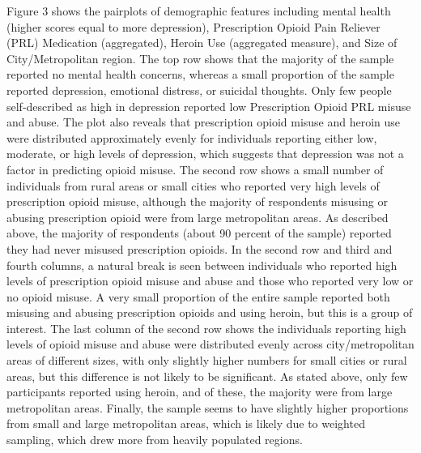 \documentclass[sigconf]{acmart}
\begin{document}

Figure 3 shows the pairplots of demographic features including mental health
(higher scores equal to more depression), Prescription Opioid Pain Reliever
(PRL) Medication (aggregated), Heroin Use (aggregated measure), and Size of 
City/Metropolitan region. The top row shows that the majority of the sample 
reported no mental health concerns, whereas a small proportion of the sample 
reported depression, emotional distress, or suicidal thoughts. Only few people 
self-described as high in depression reported low Prescription Opioid PRL 
misuse and abuse. The plot also reveals that prescription opioid misuse and 
heroin use were distributed approximately evenly for individuals reporting 
either low, moderate, or high levels of depression, which suggests that 
depression was not a factor in predicting opioid misuse. The second row shows 
a small number of individuals from rural areas or small cities who reported 
very high levels of prescription opioid misuse, although the majority of 
respondents misusing or abusing prescription opioid were from large 
metropolitan areas. As described above, the majority of respondents (about
90 percent of the sample) reported they had never misused prescription 
opioids. In the second row and third and fourth columns, a natural break is 
seen between individuals who reported high levels of prescription opioid 
misuse and abuse and those who reported very low or no opioid misuse. A very 
small proportion of the entire sample reported both misusing and abusing 
prescription opioids and using heroin, but this is a group of interest. The 
last column of the second row shows the individuals reporting high levels of 
opioid misuse and abuse were distributed evenly across city/metropolitan areas 
of different sizes, with only slightly higher numbers for small cities or 
rural areas, but this difference is not likely to be significant. As stated 
above, only few participants reported using heroin, and of these, the majority 
were from large metropolitan areas. Finally, the sample seems to have slightly 
higher proportions from small and large metropolitan areas, which is likely 
due to weighted sampling, which drew more from heavily populated regions.
\end{document}
